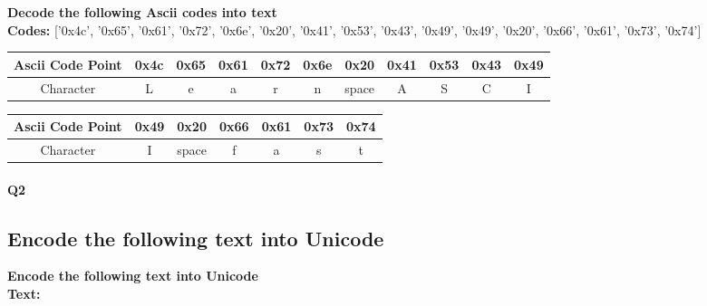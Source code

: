           \textbf{Decode the following Ascii codes into text}\\
      \textbf{Codes:} ['0x4c', '0x65', '0x61', '0x72', '0x6e', '0x20', '0x41', '0x53', '0x43', '0x49', '0x49', '0x20', '0x66', '0x61', '0x73', '0x74']\\[6pt]



      \begin{tabular}{|c|c|c|c|c|c|c|c|c|c|c|}
        \hline
        Ascii Code Point
          & 0x4c
          & 0x65
          & 0x61
          & 0x72
          & 0x6e
          & 0x20
          & 0x41
          & 0x53
          & 0x43
          & 0x49
 \\
        \hline
        Character
          &                 L
          &                 e
          &                 a
          &                 r
          &                 n
          &                 space
          &                 A
          &                 S
          &                 C
          &                 I
 \\
        \hline
      \end{tabular}

    \vspace{1em} %



      \begin{tabular}{|c|c|c|c|c|c|c|}
        \hline
        Ascii Code Point
          & 0x49
          & 0x20
          & 0x66
          & 0x61
          & 0x73
          & 0x74
 \\
        \hline
        Character
          &                 I
          &                 space
          &                 f
          &                 a
          &                 s
          &                 t
 \\
        \hline
      \end{tabular}

    \vspace{1em} %



\paragraph{Q2}




\subsection*{Encode the following text into Unicode}
      \textbf{Encode the following text into Unicode}\\
  \textbf{Text:} \\[6pt]

